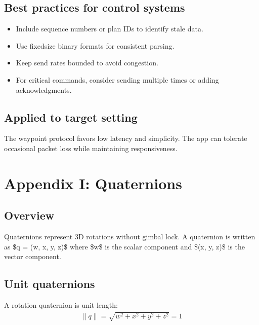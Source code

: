 \documentclass[letterpaper,10pt,english]{sphinxmanual}
\begin{document}
\section{Best practices for control systems}
\label{\detokenize{appendix_h_udp:best-practices-for-control-systems}}\begin{itemize}
\item {} 
\sphinxAtStartPar
Include sequence numbers or plan IDs to identify stale data.

\item {} 
\sphinxAtStartPar
Use fixed\sphinxhyphen{}size binary formats for consistent parsing.

\item {} 
\sphinxAtStartPar
Keep send rates bounded to avoid congestion.

\item {} 
\sphinxAtStartPar
For critical commands, consider sending multiple times or adding acknowledgments.

\end{itemize}


\section{Applied to target setting}
\label{\detokenize{appendix_h_udp:applied-to-target-setting}}
\sphinxAtStartPar
The waypoint protocol favors low latency and simplicity. The app can tolerate
occasional packet loss while maintaining responsiveness.


\chapter{Appendix I: Quaternions}
\label{\detokenize{appendix_i_quaternions:appendix-i-quaternions}}\label{\detokenize{appendix_i_quaternions::doc}}

\section{Overview}
\label{\detokenize{appendix_i_quaternions:overview}}
\sphinxAtStartPar
Quaternions represent 3D rotations without gimbal lock. A quaternion is written
as \$q = (w, x, y, z)\$ where \$w\$ is the scalar component and \$(x, y, z)\$ is the
vector component.


\section{Unit quaternions}
\label{\detokenize{appendix_i_quaternions:unit-quaternions}}
\sphinxAtStartPar
A rotation quaternion is unit length:
\begin{equation*}
\begin{split}\|q\| = \sqrt{w^2 + x^2 + y^2 + z^2} = 1\end{split}
\end{equation*}
\end{document}
